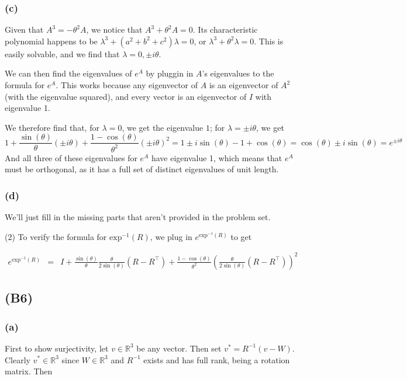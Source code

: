 \documentclass{article}
\begin{document}
\subsubsection{(c)}
Given that $A^3 = -\theta^2A$, we notice that $A^3 + \theta^2A = 0$.
Its characteristic polynomial happens to be $\lambda^3 + (a^2 + b^2 + c^2)\lambda = 0$, or $\lambda^3 + \theta^2\lambda = 0$.
This is easily solvable, and we find that $\lambda = 0, \pm i\theta$.

We can then find the eigenvalues of $e^A$ by pluggin in $A$'s eigenvalues to the formula for $e^A$.
This works because any eigenvector of $A$ is an eigenvector of $A^2$ (with the eigenvalue squared), and every vector is an eigenvector of $I$ with eigenvalue 1.

We therefore find that, for $\lambda=0$, we get the eigenvalue $1$;
for $\lambda=\pm i\theta$, we get
\[1 + \frac{\sin(\theta)}{\theta}(\pm i\theta) + \frac{1-\cos(\theta)}{\theta^2}(\pm i\theta)^2
= 1 \pm i\sin(\theta) - 1 + \cos(\theta) = \cos(\theta) \pm i\sin(\theta)
= e^{\pm i\theta}\]
And all three of these eigenvalues for $e^A$ have eigenvalue 1, which means that $e^A$ must be orthogonal, as it has a full set of distinct eigenvalues of unit length.

\subsubsection{(d)}
We'll just fill in the missing parts that aren't provided in the problem set.

\noindent (2)
To verify the formula for $\text{exp}^{-1}(R)$, we plug in $e^{\text{exp}^{-1}(R)}$ to get

\begin{eqnarray*}
e^{\text{exp}^{-1}(R)}&=& 
I + \frac{\sin(\theta)}{\theta} \frac{\theta}{2\sin(\theta)}(R - R^\top)
+ \frac{1-\cos(\theta)}{\theta^2} \left( \frac{\theta}{2\sin(\theta)}(R - R^\top) \right)^2
\end{eqnarray*}

\subsection{(B6)}

\subsubsection{(a)} First to show surjectivity, let $v \in \mathbb{R}^3$ be any vector. Then set $v^* = R^{-1} (v - W)$. Clearly $v^* \in \mathbb{R}^3$ since $W \in \mathbb{R}^3$ and $R^{-1}$ exists and has full rank, being a rotation matrix. Then
\end{document}
